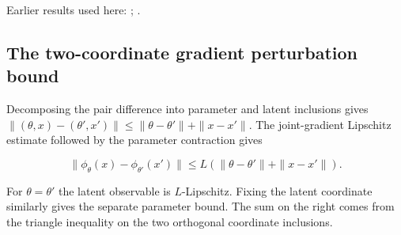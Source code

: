 \documentclass[11pt,a4paper]{report}
\begin{document}
Earlier results used here: \cite[Section~3.1.1]{LangevinLean2026IPLA}; \cite[Section~3.3.1]{LangevinLean2026IPLA}.
\subsection{\texorpdfstring{The two-coordinate gradient perturbation bound}{The two-coordinate gradient perturbation bound}}
\label{report-step-ProximalLangevin-MeanFieldDrift-lean-3}


Decomposing the pair difference into parameter and latent inclusions gives \(\|(\theta,x)-(\theta',x')\|\le\|\theta-\theta'\|+\|x-x'\|\). The joint-gradient Lipschitz estimate followed by the parameter contraction gives

\[\|\phi_\theta(x)-\phi_{\theta'}(x')\|\le L(\|\theta-\theta'\|+\|x-x'\|).\]

For \(\theta=\theta'\) the latent observable is \(L\)-Lipschitz. Fixing the latent coordinate similarly gives the separate parameter bound. The sum on the right comes from the triangle inequality on the two orthogonal coordinate inclusions.
\end{document}
